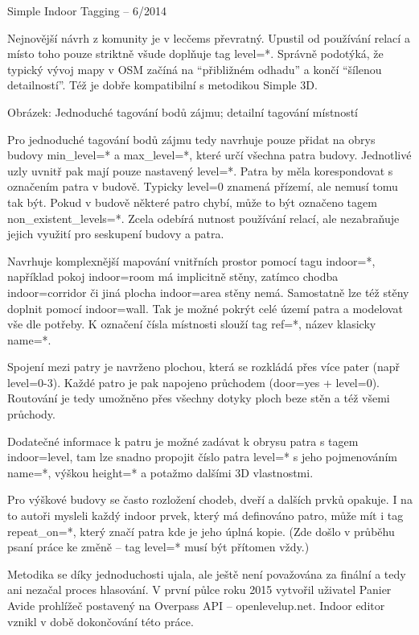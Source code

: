 Simple Indoor Tagging – 6/2014



Nejnovější návrh z komunity je v lecčems převratný. Upustil od používání relací a místo toho pouze striktně všude doplňuje tag level=*. Správně podotýká, že typický vývoj mapy v OSM začíná na “přibližném odhadu” a končí “šílenou detailností”. Též je dobře kompatibilní s metodikou Simple 3D.



Obrázek: Jednoduché tagování bodů zájmu; detailní tagování místností

Pro jednoduché tagování bodů zájmu tedy navrhuje pouze přidat na obrys budovy min\_level=* a max\_level=*, které určí všechna patra budovy. Jednotlivé uzly uvnitř pak mají pouze nastavený level=*.  Patra by měla korespondovat s označením patra v budově. Typicky level=0 znamená přízemí, ale nemusí tomu tak být. Pokud v budově některé patro chybí, může to být označeno tagem non\_existent\_levels=*.  Zcela odebírá nutnost používání relací, ale nezabraňuje jejich využití pro seskupení budovy a patra.

Navrhuje komplexnější mapování vnitřních prostor pomocí tagu indoor=*, například pokoj indoor=room má implicitně stěny, zatímco chodba indoor=corridor či jiná plocha indoor=area stěny nemá. Samostatně lze též stěny doplnit pomocí indoor=wall. Tak je možné pokrýt celé území patra a modelovat vše dle potřeby. K označení čísla místnosti slouží tag ref=*, název klasicky name=*.

Spojení mezi patry je navrženo plochou, která se rozkládá přes více pater (např level=0-3). Každé patro je pak napojeno průchodem (door=yes + level=0). Routování je tedy umožněno přes všechny dotyky ploch beze stěn a též všemi průchody.

Dodatečné informace k patru je možné zadávat k obrysu patra s tagem indoor=level, tam lze snadno propojit číslo patra level=* s jeho pojmenováním name=*, výškou height=* a potažmo dalšími 3D vlastnostmi.

Pro výškové budovy se často rozložení chodeb, dveří a dalších prvků opakuje. I na to autoři mysleli každý indoor prvek, který má definováno patro, může mít i tag repeat\_on=*, který značí patra kde je jeho úplná kopie. (Zde došlo v průběhu psaní práce ke změně – tag level=* musí být přítomen vždy.)

Metodika se díky jednoduchosti ujala, ale ještě není považována za finální a tedy ani nezačal proces hlasování. V první půlce roku 2015 vytvořil uživatel Panier Avide prohlížeč postavený na Overpass API – openlevelup.net. Indoor editor vznikl v době dokončování této práce.

